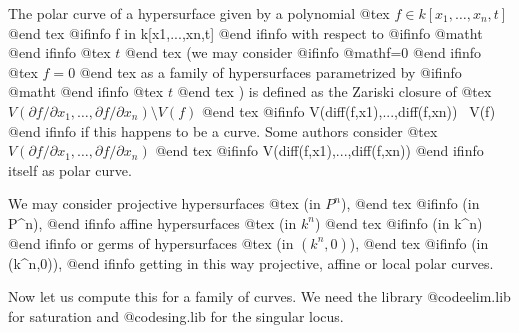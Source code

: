 The polar curve of a hypersurface given by a polynomial
@tex
$f\in k[x_1,\ldots,x_n,t]$
@end tex
@ifinfo
f in k[x1,...,xn,t]
@end ifinfo
with respect to 
@ifinfo
@math{t}
@end ifinfo
@tex
$t$
@end tex
 (we may consider 
@ifinfo
@math{f=0}
@end ifinfo
@tex
$f=0$
@end tex
 as a family of
hypersurfaces parametrized by 
@ifinfo
@math{t}
@end ifinfo
@tex
$t$
@end tex
) is defined as the Zariski
closure of
@tex
$V(\partial f/\partial x_1,\ldots,\partial f/\partial x_n) \setminus V(f)$
@end tex
@ifinfo
V(diff(f,x1),...,diff(f,xn)) \ V(f)
@end ifinfo
if this happens to be a curve.  Some authors consider
@tex
$V(\partial f/\partial x_1,\ldots,\partial f/\partial x_n)$
@end tex
@ifinfo
V(diff(f,x1),...,diff(f,xn))
@end ifinfo
itself as polar curve.

We may consider projective hypersurfaces
@tex
(in $P^n$),
@end tex
@ifinfo
(in P^n),
@end ifinfo
affine hypersurfaces
@tex
(in $k^n$)
@end tex
@ifinfo
(in k^n)
@end ifinfo
or germs of hypersurfaces
@tex
(in $(k^n,0)$),
@end tex
@ifinfo
(in (k^n,0)),
@end ifinfo
getting in this way
projective, affine or local polar curves.

Now let us compute this for a family of curves.  We need the library
@code{elim.lib} for saturation and @code{sing.lib} for the singular
locus.

